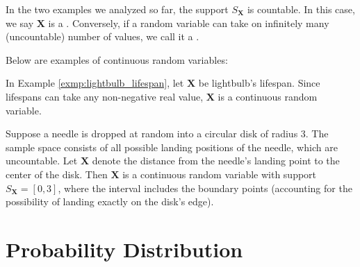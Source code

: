 In the two examples we analyzed so far, the support \( S_{\bm{X}} \) is countable.
In this case, we say \( \bm{X} \) is a .
Conversely, if a random variable can take on infinitely many (uncountable) number of values,
we call it a .

Below are examples of continuous random variables:

\begin{exmp}
    In Example \autoref{exmp:lightbulb_lifespan}, let \( \bm{X} \) be lightbulb's lifespan.
    Since lifespans can take any non-negative real value, \( \bm{X} \) is a continuous random variable.
\end{exmp}

\begin{exmp}
    Suppose a needle is dropped at random into a circular disk of radius 3.
    The sample space consists of all possible landing positions of the needle, which are uncountable.
    Let \( \bm{X} \) denote the distance from the needle's landing point to the center of the disk.
    Then \( \bm{X} \) is a continuous random variable with support \( S_{\bm{X}} = [0, 3] \),
    where the interval includes the boundary points (accounting for the possibility of landing exactly on the disk's edge).
\end{exmp}

\section{Probability Distribution}

